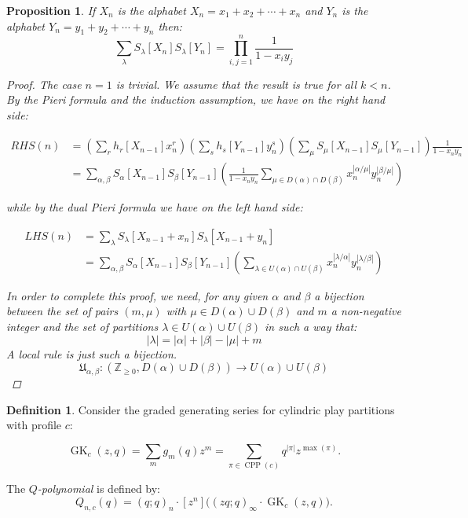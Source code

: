 \documentclass[11pt]{article}
\theoremstyle{plain}
\newtheorem{proposition}[theorem]{Proposition}
\theoremstyle{definition}
\newtheorem{definition}[theorem]{Definition}
\DeclareMathOperator{\CPP}{CPP}
\newcommand{\GK}{\operatorname{GK}}
\newcommand{\qpoch}[2]{(#1;#2)_\infty}
\newcommand{\qpochn}[3]{(#1;#2)_{#3}}
\begin{document}
\begin{proposition}
If $X_n$ is the alphabet $X_n = x_1 + x_2 + \cdots + x_n$
and $Y_n$ is the alphabet $Y_n = y_1 + y_2 + \cdots + y_n$ then:
\[ \sum_\lambda S_\lambda[X_n] S_\lambda[Y_n] = \prod_{i,j=1}^n \frac{1}{1-x_iy_j} \]
\begin{proof}
The case $n=1$ is trivial.
We assume that the result is true for all $k < n$.
By the Pieri formula and the induction assumption, we have on the right hand side:

\begin{align*}
RHS(n) & = \left (\sum_r h_r[X_{n-1}] x_n^r \right ) 
\left (\sum_s h_s[Y_{n-1}] y_n^s \right ) \left (  \sum_\mu S_\mu[X_{n-1}] S_\mu[Y_{n-1}] \right )\frac{1}{1-x_n y_n} \\
& = \sum_{\alpha, \beta} S_{\alpha}[X_{n-1}] S_{\beta}[Y_{n-1}] \left ( \frac{1}{1-x_n y_n} \sum_{\mu \in D(\alpha) \cap D(\beta)} x_n^{|\alpha / \mu|} y_n^{|\beta / \mu|} \right )
\end{align*}

while by the dual Pieri formula we have on the left hand side:

\begin{align*}
LHS(n) & = \sum_\lambda S_\lambda[X_{n-1} + x_n] S_\lambda[X_{n-1} + y_n] \\
& = \sum_{\alpha, \beta} S_\alpha[X_{n-1}] S_\beta[Y_{n-1}] \left ( \sum_{\lambda \in U(\alpha) \cap U(\beta)} x_n^{|\lambda / \alpha|} y_n^{|\lambda / \beta|} \right )
\end{align*}


In order to complete this proof, we need, for any given $\alpha$ and $\beta$ a bijection between the set of pairs $(m,\mu)$ with $\mu \in D(\alpha) \cup D(\beta)$ and $m$ a non-negative integer and the set of partitions $\lambda \in U(\alpha) \cup U(\beta)$ in such a way that:
\[ |\lambda|  = |\alpha | + |\beta| - |\mu| + m \]
A \emph{local rule}  is just such a bijection. 
\begin{equation}
\mathfrak{U}_{\alpha,\beta} : (\mathbb{Z}_{\geq 0}, D(\alpha) \cup D(\beta)) \to U(\alpha) \cup U(\beta)
\end{equation}

\end{proof}
\end{proposition}

\newpage

\begin{definition}
Consider the graded generating series for cylindric play partitions with profile $c$:

\begin{equation}\label{eq:gm}
  \GK_c(z,q) = \sum_m g_m(q) z^m 
  = \sum_{\pi \in \CPP(c)}
    q^{|\pi|}z^{\max(\pi)}.
\end{equation}


The \emph{$Q$-polynomial} is defined by:
\begin{equation}\label{eq:Q-def}
  Q_{n,c}(q)
  = \qpochn{q}{q}{n}
    \cdot [z^n]\bigl(\qpoch{zq}{q} \cdot \GK_c(z,q)\bigr).
\end{equation}
\end{definition}
\end{document}
